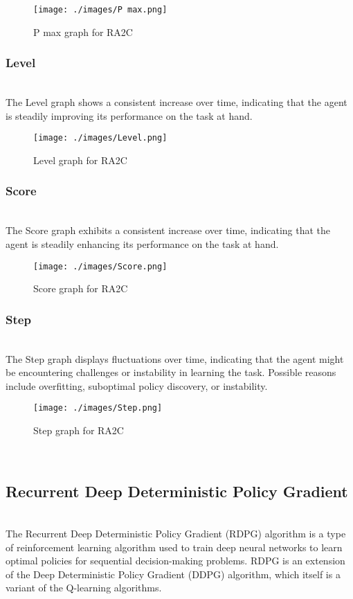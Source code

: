 \documentclass[preprint,12pt]{elsarticle}
\begin{document}
\begin{figure}[!htbp]
    \centering
    \texttt{[image: ./images/P max.png]}
    \caption{P max graph for RA2C}
\end{figure}
\vspace{-0.5cm}
\subsubsection{Level}\\
The Level graph shows a consistent increase over time, indicating that the agent is steadily improving its performance on the task at hand.\\
\begin{figure}[!htbp]
    \centering
    \texttt{[image: ./images/Level.png]}
    \caption{Level graph for RA2C}
\end{figure}
\vspace{-0.5cm}
\subsubsection{Score}\\
The Score graph exhibits a consistent increase over time, indicating that the agent is steadily enhancing its performance on the task at hand.\\
\begin{figure}[!htbp]
    \centering
    \texttt{[image: ./images/Score.png]}
    \caption{Score graph for RA2C}
\end{figure}

\subsubsection{Step}\\
The Step graph displays fluctuations over time, indicating that the agent might be encountering challenges or instability in learning the task. Possible reasons include overfitting, suboptimal policy discovery, or instability.\\
\begin{figure}[!htbp]
    \centering
    \texttt{[image: ./images/Step.png]}
    \caption{Step graph for RA2C}
\end{figure}
 
\\

\subsection{Recurrent Deep Deterministic Policy Gradient}\\
The Recurrent Deep Deterministic Policy Gradient (RDPG) algorithm is a type of reinforcement learning algorithm used to train deep neural networks to learn optimal policies for sequential decision-making problems. RDPG is an extension of the Deep Deterministic Policy Gradient (DDPG) algorithm, which itself is a variant of the Q-learning algorithms.\\
\end{document}

